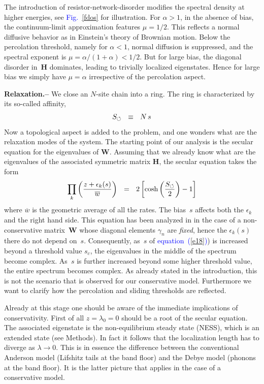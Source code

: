 \documentclass[aps,pre,floats,floatfix,twocolumn]{revtex4}
\newcommand{\be}[1]{\begin{eqnarray}\ifthenelse{#1=-1}{\nonumber}{\ifthenelse{#1=0}{}{\label{e#1}}}}
\newcommand{\eeq}{\end{eqnarray}}
\newcommand{\Eq}[1]{\textcolor{blue}{{equation}\!~(\ref{#1})}}
\newcommand{\Fig}[1]{\textcolor{blue}{Fig.}\!\!~\ref{#1}}
\newcommand{\sect}[1]{{\bf #1.-- }}
\begin{document}
The introduction of resistor-network-disorder modifies 
the spectral density at higher energies,
see \Fig{fdos} for illustration. 
For ${\alpha>1}$, in the absence of bias, 
the continuum-limit approximation features ${\mu=1/2}$.
This reflects a normal diffusive behavior 
as in Einstein's theory of Brownian motion. 
Below the percolation threshold, namely for ${\alpha<1}$,
normal diffusion is suppressed, 
and the spectral exponent is ${\mu=\alpha/(1{+}\alpha)<1/2}$. 
But for large bias, the diagonal disorder in~$\bm{H}$ dominates,  
leading to trivially localized eigenstates. 
Hence for large bias we simply have ${\mu=\alpha}$
irrespective of the percolation aspect.  


\sect{Relaxation}
%
We close an $N$-site chain into a ring. 
The ring is characterized by its so-called affinity, 
%
\be{18}
S_{\circlearrowleft} \ \ \equiv \ \ N \, s
\eeq 
%
Now a topological aspect is added to the problem, 
and one wonders what are the relaxation modes of the system. 
%
The starting point of our analysis is the secular 
equation for the eigenvalues of $\bm{W}$.
Assuming that we already know what are the eigenvalues 
of the associated symmetric matrix $\bm{H}$,    
the secular equation takes the form \cite{det1} 
%
\be{20}
\prod_k \left(\frac{z+\epsilon_k(s)}{\overline{w}}\right) \ \ = \ \ 2\left[\cosh\left(\frac{S_{\circlearrowleft}}{2}\right)-1\right]
\eeq
%
where ${\overline{w}}$ is the geometric average of all the rates.
The bias~$s$ affects both the $\epsilon_k$ and the right hand side.
%
This equation has been analyzed in \cite{Shnerb1} 
in the case of a non-conservative matrix~$\bm{W}$ 
whose diagonal elements $\gamma_n$ are {\em fixed}, 
hence the $\epsilon_k(s)$ there do not depend on~$s$. 
Consequently, as~$s$ of \Eq{e18}) is increased beyond 
a threshold value $s_{c}$, the eigenvalues in the middle 
of the spectrum become complex. 
As~$s$ is further increased beyond some higher threshold value, 
the entire spectrum becomes complex. 
As already stated in the introduction, this is not the scenario 
that is observed for our conservative model.
Furthermore we want to clarify how the percolation 
and sliding thresholds are reflected.

Already at this stage one should be aware of the immediate 
implications of conservativity. First of all ${z=\lambda_0=0}$ 
should be a root of the secular equation. 
The associated eigenstate is the non-equilibrium steady state (NESS), 
which is an extended state (see Methods). 
In fact it follows that the localization length has 
to diverge as ${\lambda\rightarrow0}$. 
This is in essence the difference between the 
conventional Anderson model (Lifshitz tails at the band floor) 
and the Debye model (phonons at the band floor). 
It is the latter picture that applies in the 
case of a conservative model.    
\end{document}
